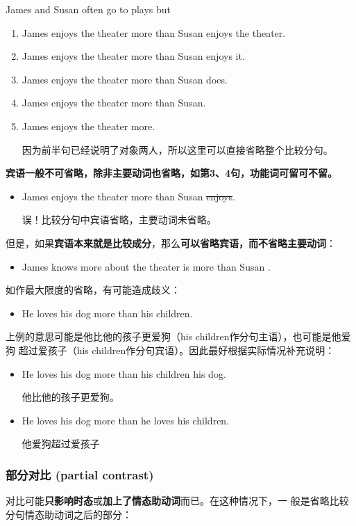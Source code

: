 James and Susan often go to plays but
\begin{enumerate}
\item James enjoys the theater more than Susan enjoys the theater.
\item James enjoys the theater more than Susan enjoys it.
\item James enjoys the theater more than Susan does.
\item James enjoys the theater more than Susan.
\item James enjoys the theater more.

  因为前半句已经说明了对象两人，所以这里可以直接省略整个比较分句。
\end{enumerate}
\textbf{宾语一般不可省略，除非主要动词也省略，如第3、4句，功能词可留可不留。}
\begin{itemize}
\item James enjoys the theater more than Susan \sout{enjoys}.

  误！比较分句中宾语省略，主要动词未省略。
\end{itemize}
但是，如果\textbf{宾语本来就是比较成分}，那么\textbf{可以省略宾语，而不省略主要动词}：
\begin{itemize}
\item James knows more about the theater is more than Susan .
\end{itemize}


如作最大限度的省略，有可能造成歧义：
\begin{itemize}
\item He loves his dog more than his children.
\end{itemize}
上例的意思可能是他比他的孩子更爱狗（his children作分句主语），也可能是他爱狗
超过爱孩子（his children作分句宾语）。因此最好根据实际情况补充说明：
\begin{itemize}
\item He loves his dog more than his children  his dog.

  他比他的孩子更爱狗。
\item He loves his dog more than he loves his children.

  他爱狗超过爱孩子
\end{itemize}


\subsubsection{部分对比 (partial contrast)}

对比可能\textbf{只影响时态}或\textbf{加上了情态助动词}而已。在这种情况下，一
般是省略比较分句情态助动词之后的部分：

